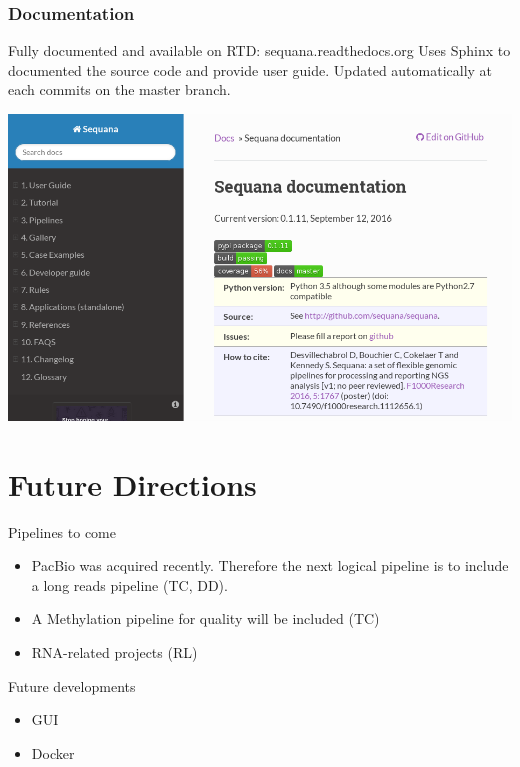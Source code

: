 \documentclass{beamer}
\begin{document}
\begin{frame}[fragile]
    \frametitle{Documentation}
    Fully documented and available on RTD: sequana.readthedocs.org
    Uses Sphinx to documented the source code and provide user guide.
    Updated automatically at each commits on the master branch.
\begin{center}
\includegraphics[scale=0.3]{images/rtd}
\end{center}
    
\end{frame}


\section{Future Directions}

\begin{frame}
\begin{block}{Pipelines to come}
\begin{itemize}
 \item PacBio was acquired recently. Therefore the next logical pipeline is to include
 a long reads pipeline (TC, DD). 
 \item A Methylation pipeline for quality will be included (TC)
 \item RNA-related projects (RL)
\end{itemize}
\end{block}

\begin{block}{Future developments}
 \begin{itemize}
  \item GUI 
  \item Docker
 \end{itemize}
\end{block}
 \end{frame}
\end{document}
